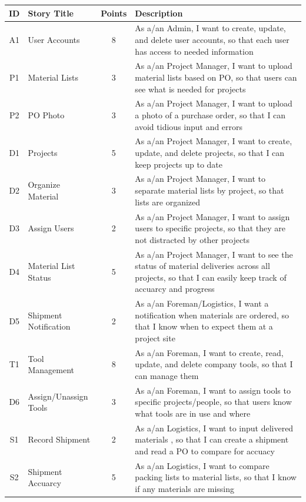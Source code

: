 \documentclass{article}
\begin{document}
\begin{longtable}[h]{c l c p{10cm}}
\hline
\textbf{ID} & \textbf{Story Title} & \textbf{Points} & \textbf{Description} \\
\hline
		
A1 & User Accounts & 8 & As a/an Admin, I want to create, update, and delete user accounts, so that each user has access to needed information \\ \hline
P1 & Material Lists & 3 & As a/an Project Manager, I want to upload material lists based on PO, so that users can see what is needed for projects \\ \hline
P2 & PO Photo & 3 & As a/an Project Manager, I want to upload a photo of a purchase order, so that I can avoid tidious input and errors \\ \hline
D1 & Projects & 5 & As a/an Project Manager, I want to create, update, and delete projects, so that I can keep projects up to date \\ \hline
D2 & Organize Material & 3 & As a/an Project Manager, I want to separate material lists by project, so that lists are organized \\ \hline
D3 & Assign Users &	2 & As a/an Project Manager, I want to assign users to specific projects, so that they are not distracted by other projects \\ \hline
D4 & Material List Status &	5 & As a/an Project Manager, I want to see the status of material deliveries across all projects, so that I can easily keep track of accuarcy and progress \\ \hline
D5 & Shipment Notification & 2 & As a/an Foreman/Logistics, I want a notification when materials are ordered, so that I know when to expect them at a project site \\ \hline
T1 & Tool Management & 8 & As a/an Foreman, I want to create, read, update, and delete company tools, so that I can manage them \\ \hline
D6 & Assign/Unassign Tools & 3 & As a/an Foreman, I want to assign tools to specific projects/people, so that users know what tools are in use and where \\ \hline
S1 & Record Shipment & 2 & As a/an Logistics, I want to input delivered materials , so that I can create a shipment and read a PO to compare for accuacy \\ \hline
S2 & Shipment Accuarcy & 5 & As a/an Logistics, I want to compare packing lists to material lists, so that I know if any materials are missing \\ \hline

\end{longtable}
\end{document}
